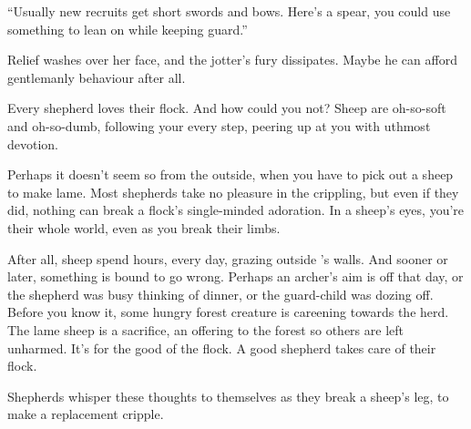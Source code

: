 \begin{multicols}{2}
\begin{exampletext}
  ``Usually new recruits get short swords and bows.
  Here's a spear, you could use something to lean on while keeping guard.''

  Relief washes over her face, and the \gls{jotter}'s fury dissipates.
  Maybe he can afford gentlemanly behaviour after all.
\end{exampletext}

\begin{exampletext}
  Every shepherd loves their flock.
  And how could you not?
  Sheep are oh-so-soft and oh-so-dumb, following your every step, peering up at you with uthmost devotion.

  Perhaps it doesn't seem so from the outside, when you have to pick out a sheep to make lame.
  Most shepherds take no pleasure in the crippling, but even if they did, nothing can break a flock's single-minded adoration.
  In a sheep's eyes, you're their whole world, even as you break their limbs.

  After all, sheep spend hours, every day, grazing outside 's walls.
  And sooner or later, something is bound to go wrong.
  Perhaps an archer's aim is off that day, or the shepherd was busy thinking of dinner, or the guard-child was dozing off.
  Before you know it, some hungry forest creature is careening towards the herd.
  The lame sheep is a sacrifice, an offering to the forest so others are left unharmed.
  It's for the good of the flock.
  A good shepherd takes care of their flock.

  Shepherds whisper these thoughts to themselves as they break a sheep's leg, to make a replacement cripple.
\end{exampletext}

\end{multicols}
